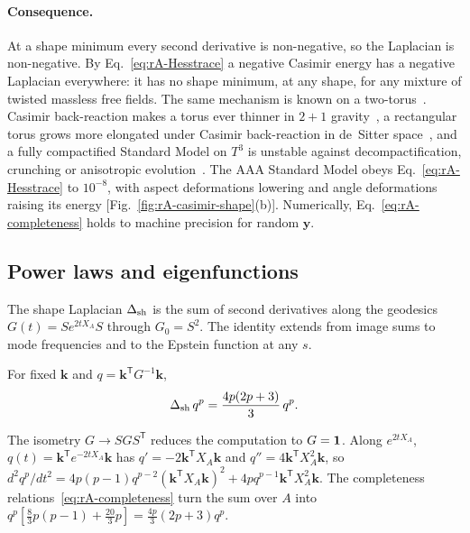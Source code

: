 \paragraph{Consequence.}
At a shape minimum every second derivative is non-negative, so the Laplacian is non-negative.
By Eq.~\eqref{eq:rA-Hesstrace} a negative Casimir energy has a negative Laplacian everywhere: it has no shape minimum, at any shape, for any mixture of twisted massless free fields.
The same mechanism is known on a two-torus~\cite{Ponton:2001hq,Luo:2022tqy,Aparici:2025kjj}.
Casimir back-reaction makes a torus ever thinner in $2+1$ gravity~\cite{Seriu:1995hc}, a rectangular torus grows more elongated under Casimir back-reaction in de~Sitter space~\cite{COMPACT:2026vdj}, and a fully compactified Standard Model on $T^3$ is unstable against decompactification, crunching or anisotropic evolution~\cite{Arkani-Hamed:2007ryu}.
The AAA Standard Model obeys Eq.~\eqref{eq:rA-Hesstrace} to $10^{-8}$, with aspect deformations lowering and angle deformations raising its energy [Fig.~\ref{fig:rA-casimir-shape}(b)]. %
Numerically, Eq.~\eqref{eq:rA-completeness} holds to machine precision for random $\bm y$. %

\subsection{Power laws and eigenfunctions}
\label{rA:sh-power}

The shape Laplacian $\Delta_{\mathrm{sh}}$ is the sum of second derivatives along the geodesics $G(t)=Se^{2tX_A}S$ through $G_0=S^2$.
The identity extends from image sums to mode frequencies and to the Epstein function at any $s$.

\begin{rAlemma}\label{lem:rA-power}
For fixed $\bm k$ and $q=\bm k^{\mathsf T}G^{-1}\bm k$,
\begin{equation}
\Delta_{\mathrm{sh}}\,q^p=\frac{4p(2p+3)}{3}\,q^p .
\label{eq:rA-powerlaw}
\end{equation}
\end{rAlemma}

\begin{rAproof}
The isometry $G\to SGS^{\mathsf T}$ reduces the computation to $G=\mathbf{1}$.
Along $e^{2tX_A}$, $q(t)=\bm k^{\mathsf T}e^{-2tX_A}\bm k$ has $q'=-2\bm k^{\mathsf T}X_A\bm k$ and $q''=4\bm k^{\mathsf T}X_A^2\bm k$, so $d^2q^p/dt^2=4p(p-1)q^{p-2}(\bm k^{\mathsf T}X_A\bm k)^2+4pq^{p-1}\bm k^{\mathsf T}X_A^2\bm k$.
The completeness relations~\eqref{eq:rA-completeness} turn the sum over $A$ into $q^p[\tfrac83p(p-1)+\tfrac{20}3p]=\tfrac{4p}3(2p+3)q^p$.
\end{rAproof}


